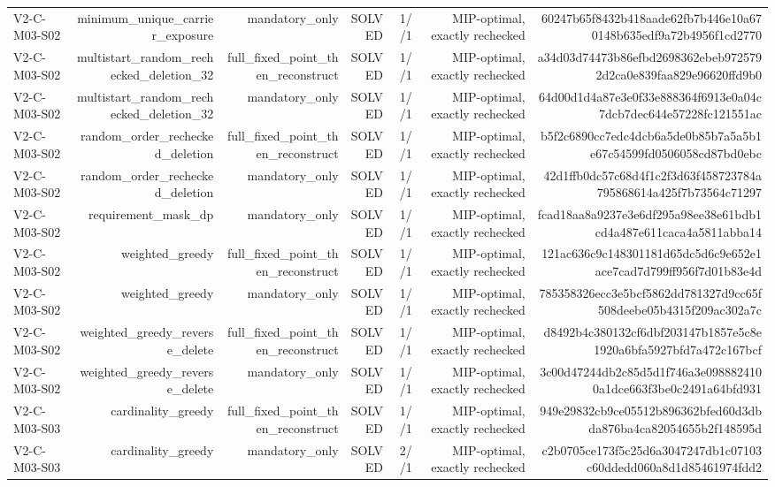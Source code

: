 {\begin{longtable}{lrrrrrr}
V2-C-M03-S02 & minimum\_unique\_carrier\_exposure & mandatory\_only & SOLVED & 1//1 & MIP-optimal, exactly rechecked & 60247b65f8432b418aade62fb7b446e10a670148b635edf9a72b4956f1cd2770 \\
V2-C-M03-S02 & multistart\_random\_rechecked\_deletion\_32 & full\_fixed\_point\_then\_reconstruct & SOLVED & 1//1 & MIP-optimal, exactly rechecked & a34d03d74473b86efbd2698362ebeb9725792d2ca0e839faa829e96620ffd9b0 \\
V2-C-M03-S02 & multistart\_random\_rechecked\_deletion\_32 & mandatory\_only & SOLVED & 1//1 & MIP-optimal, exactly rechecked & 64d00d1d4a87e3e0f33e888364f6913e0a04c7dcb7dec644e57228fc121551ac \\
V2-C-M03-S02 & random\_order\_rechecked\_deletion & full\_fixed\_point\_then\_reconstruct & SOLVED & 1//1 & MIP-optimal, exactly rechecked & b5f2c6890cc7edc4dcb6a5de0b85b7a5a5b1e67c54599fd0506058cd87bd0ebc \\
V2-C-M03-S02 & random\_order\_rechecked\_deletion & mandatory\_only & SOLVED & 1//1 & MIP-optimal, exactly rechecked & 42d1ffb0dc57c68d4f1c2f3d63f458723784a795868614a425f7b73564c71297 \\
V2-C-M03-S02 & requirement\_mask\_dp & mandatory\_only & SOLVED & 1//1 & MIP-optimal, exactly rechecked & fcad18aa8a9237e3e6df295a98ee38e61bdb1cd4a487e611caca4a5811abba14 \\
V2-C-M03-S02 & weighted\_greedy & full\_fixed\_point\_then\_reconstruct & SOLVED & 1//1 & MIP-optimal, exactly rechecked & 121ac636c9c148301181d65dc5d6c9e652e1ace7cad7d799ff956f7d01b83e4d \\
V2-C-M03-S02 & weighted\_greedy & mandatory\_only & SOLVED & 1//1 & MIP-optimal, exactly rechecked & 785358326ecc3e5bcf5862dd781327d9cc65f508deebe05b4315f209ac302a7c \\
V2-C-M03-S02 & weighted\_greedy\_reverse\_delete & full\_fixed\_point\_then\_reconstruct & SOLVED & 1//1 & MIP-optimal, exactly rechecked & d8492b4c380132cf6dbf203147b1857e5c8e1920a6bfa5927bfd7a472c167bcf \\
V2-C-M03-S02 & weighted\_greedy\_reverse\_delete & mandatory\_only & SOLVED & 1//1 & MIP-optimal, exactly rechecked & 3c00d47244db2c85d5d1f746a3e0988824100a1dce663f3be0c2491a64bfd931 \\
V2-C-M03-S03 & cardinality\_greedy & full\_fixed\_point\_then\_reconstruct & SOLVED & 1//1 & MIP-optimal, exactly rechecked & 949e29832cb9ce05512b896362bfed60d3dbda876ba4ca82054655b2f148595d \\
V2-C-M03-S03 & cardinality\_greedy & mandatory\_only & SOLVED & 2//1 & MIP-optimal, exactly rechecked & c2b0705ce173f5c25d6a3047247db1c07103c60ddedd060a8d1d85461974fdd2 \\

\end{longtable}}
